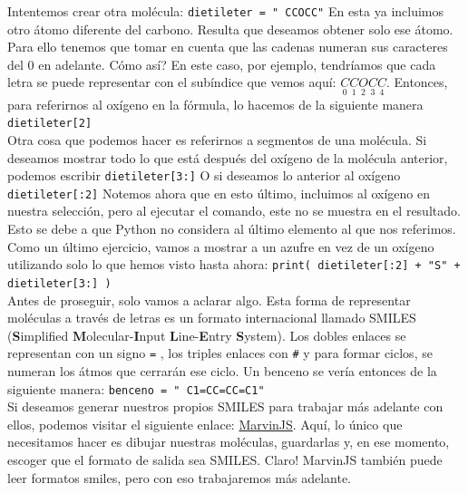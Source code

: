 \documentclass[10pt,letterpaper]{article}
\newcommand{\inlinecode}[1]{
\colorbox{light-gray}{\texttt{#1}}
}
\begin{document}
Intentemos crear otra mol\'ecula: \inlinecode{dietileter = "\ \hspace{-2mm}CCOCC"} En esta ya incluimos otro \'atomo diferente del carbono. Resulta que deseamos obtener solo ese \'atomo. Para ello tenemos que tomar en cuenta que las cadenas numeran sus caracteres del 0 en adelante. C\'omo as\'i? En este caso, por ejemplo, tendr\'iamos que cada letra se puede representar con el sub\'indice que vemos aqu\'i: $\underset{0}{C} \underset{1}{C} \underset{2}{O} \underset{3}{C} \underset{4}{C}$. Entonces, para referirnos al ox\'igeno en la f\'ormula, lo hacemos de la siguiente manera \inlinecode{dietileter[2]}\\

Otra cosa que podemos hacer es referirnos a segmentos de una mol\'ecula. Si deseamos mostrar todo lo que est\'a despu\'es del ox\'igeno de la mol\'ecula anterior, podemos escribir \inlinecode{dietileter[3:]} O si deseamos lo anterior al ox\'igeno \inlinecode{dietileter[:2]} Notemos ahora que en esto \'ultimo, incluimos al ox\'igeno en nuestra selecci\'on, pero al ejecutar el comando, este no se muestra en el resultado. Esto se debe a que Python no considera al \'ultimo elemento al que nos referimos. Como un \'ultimo ejercicio, vamos a mostrar a un azufre en vez de un ox\'igeno utilizando solo lo que hemos visto hasta ahora: \inlinecode{print( dietileter[:2] + "S"\ + dietileter[3:] )		}\\

Antes de proseguir, solo vamos a aclarar algo. Esta forma de representar mol\'eculas a trav\'es de letras es un formato internacional llamado SMILES (\textbf{S}implified \textbf{M}olecular-\textbf{I}nput \textbf{L}ine-\textbf{E}ntry \textbf{S}ystem). Los dobles enlaces se representan con un signo \inlinecode{=}, los triples enlaces con \inlinecode{\#} y para formar ciclos, se numeran los \'atmos que cerrar\'an ese ciclo. Un benceno se ver\'ia entonces de la siguiente manera: \inlinecode{benceno = "\ \hspace{-2mm}C1=CC=CC=C1"}\\

Si deseamos generar nuestros propios SMILES para trabajar m\'as adelante con ellos, podemos visitar el siguiente enlace: \href{https://marvinjs-demo.chemaxon.com/latest/demo.html}{MarvinJS}. Aqu\'i, lo \'unico que necesitamos hacer es dibujar nuestras mol\'eculas, guardarlas y, en ese momento, escoger que el formato de salida sea SMILES. Claro! MarvinJS tambi\'en puede leer formatos smiles, pero con eso trabajaremos m\'as adelante.
\end{document}
